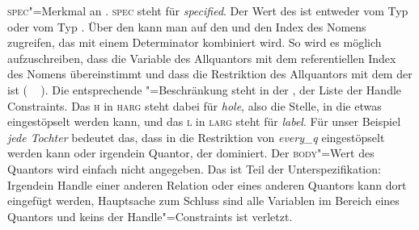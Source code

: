 \textsc{spec}"=Merkmal an \citep[--51]{ps2}. \textsc{spec} steht für \emph{specified}. Der Wert des \specms ist
entweder vom Typ  oder vom Typ . Über den \specw kann man auf den \ltopw {} und
den Index des Nomens  zugreifen, das mit einem Determinator kombiniert wird. So wird es möglich
aufzuschreiben, dass die Variable des Allquantors mit dem referentiellen Index des Nomens 
übereinstimmt und dass die Restriktion des Allquantors \qeq\vspace{-0pt} mit dem \ltopw der \nbar
ist (\, \qeq~\,). Die entsprechende \qeq"=Beschränkung steht in der \hconsl, der Liste
der Handle Constraints. Das \textsc{h} in \textsc{harg} steht dabei für \emph{hole}, also die Stelle, in die etwas
eingestöpselt werden kann, und das \textsc{l} in \textsc{larg} steht für \emph{label}. Für unser
Beispiel \emph{jede Tochter} bedeutet das, dass  in die Restriktion von
\emph{every\_q} eingestöpselt werden kann oder irgendein Quantor, der 
dominiert. Der \textsc{body}"=Wert des Quantors wird einfach nicht angegeben. Das ist Teil der
Unterspezifikation: Irgendein Handle einer anderen Relation oder eines anderen Quantors kann dort
eingefügt werden, Hauptsache zum Schluss sind alle Variablen im Bereich eines Quantors und keins der
Handle"=Constraints ist verletzt.

